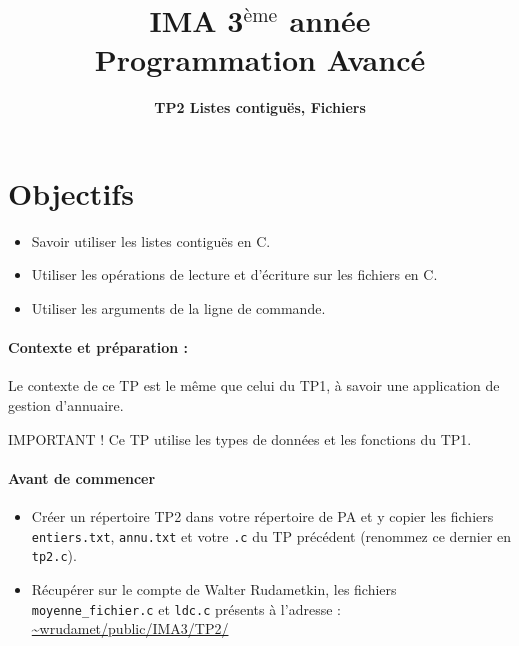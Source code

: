 \documentclass[final, a4paper, openbib, ]{article}
\title{IMA 3$^{\mbox{\`eme}}$ année\\ Programmation Avancé
}
\author{\huge \textbf{TP2 Listes contiguës, Fichiers}}
\date{}
\begin{document}
\posttitle{\par\end{center}}
\setlength{\droptitle}{-45pt}
\maketitle

\vspace{-1.7cm}
\section{Objectifs}

\begin{itemize}
	\item Savoir utiliser les listes contiguës en C.
	\item Utiliser les opérations de lecture et d'écriture sur les fichiers en C.
	\item Utiliser les arguments de la ligne de commande.
\end{itemize}


\paragraph{Contexte et préparation : } Le contexte de ce TP est le même que celui du TP1, à savoir une application de gestion d'annuaire.

\begin{alertinfo}{IMPORTANT !}
	Ce TP utilise les types de données et les fonctions du TP1.
\end{alertinfo}


\paragraph{Avant de commencer}
\begin{itemize}
\item Créer un répertoire TP2 dans votre répertoire de PA et y copier les fichiers \texttt{entiers.txt}, \texttt{annu.txt} et votre \texttt{.c} du TP précédent (renommez ce dernier en \texttt{tp2.c}).
\item Récupérer sur le compte de Walter Rudametkin, les fichiers \texttt{moyenne\_fichier.c} et \texttt{ldc.c} présents à l'adresse : \url{~wrudamet/public/IMA3/TP2/}
\end{itemize}
\end{document}
